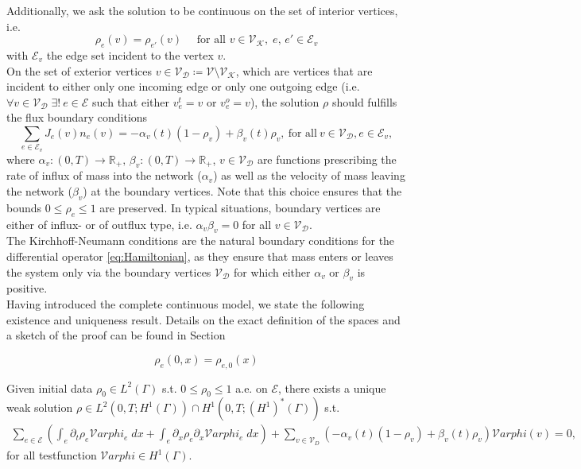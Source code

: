 Additionally, we ask the solution to be continuous on the set of interior vertices, i.e. 
\begin{equation}
    \label{continuous on vertices}
    \rho_e(v) = \rho_{e'}(v) \quad \text{ for all }v \in \mathcal{V}_\mathcal{K},\; e,\,e' \in \mathcal{E}_v
\end{equation}
with $\mathcal{E}_v$ the edge set incident to the vertex $v$. \\
On the set of exterior vertices $v \in \mathcal{V}_\mathcal{D} \coloneqq \mathcal{V} \setminus \mathcal{V}_\mathcal{K}$, which are vertices that are incident to either only one incoming edge or only one outgoing edge (i.e. $\forall v \in \mathcal{V}_\mathcal{D} \; \exists! \ e \in \mathcal{E}$ such that either $v^{t}_{e} = v$ or $v^{o}_{e} = v$), the solution $\rho$ should fulfills the flux boundary conditions
\begin{equation}
    \label{eq:Dirichlet_conditions}
    \sum_{e\in \mathcal{E}_v}J_e(v) n_e (v)=-\alpha_v(t) (1-\rho_v) + \beta_v(t) \rho_v,\ \text{for all}\ v \in \mathcal{V}_\mathcal{D}, e \in \mathcal{E}_v,
\end{equation}
where $\alpha_v \colon (0,T) \to \mathbb{R}_{+}, \, \beta_v \colon (0,T) \to \mathbb{R}_{+}$, ${v \in \mathcal{V}_\mathcal{D}}$ are functions prescribing the rate of influx of mass into the network ($\alpha_v$) as well as the velocity of mass leaving the network ($\beta_v$) at the boundary vertices. Note that this choice ensures that the bounds $0 \le \rho_e \le 1$ are preserved. In typical situations, boundary vertices are either of influx- or of outflux type, i.e. $\alpha_v \beta_v = 0$ for all $v \in \mathcal{V}_\mathcal{D}$. \\
The Kirchhoff-Neumann conditions are the natural boundary conditions for the differential operator \eqref{eq:Hamiltonian}, as they ensure that mass enters or leaves the system only via the boundary vertices $\mathcal{V}_\mathcal{D}$ for which either $\alpha_v$ or $\beta_v$ is positive. \\
Having introduced the complete continuous model, we state the following existence and uniqueness result. Details on the exact definition of the spaces and a sketch of the proof can be found in Section 

\begin{equation}
    \label{eq:initial_conditions}
    \rho_e(0,x) = \rho_{e, 0}(x) 
\end{equation}


\begin{theorem} 
    Given initial data $\rho_0 \in L^2(\Gamma)$ s.t. $0 \le \rho_0 \le 1$ a.e. on $\mathcal{E}$, there exists a unique weak solution $\rho \in L^2(0,T; H^1(\Gamma)) \cap H^1(0,T; (H^1)^*(\Gamma))$ s.t.
	\begin{align*}
		\sum_{e \in \mathcal{E}} \left(\int_e  \partial_t \rho_e \mathcal{V}arphi_e \;dx + \int_e \partial_x \rho_e\partial_x \mathcal{V}arphi_e \;dx\right) + \sum_{v \in \mathcal{V}_D} (-\alpha_v(t) (1-\rho_v) + \beta_v(t) \rho_v)\mathcal{V}arphi(v) = 0,
	\end{align*}
	for all testfunction $\mathcal{V}arphi \in H^1(\Gamma)$.
\end{theorem}

